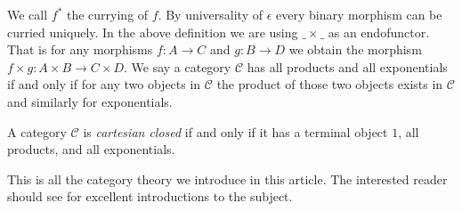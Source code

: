 We call ${f}^*$ the currying of $f$.  By universality of $\epsilon$
every binary morphism can be curried uniquely.  In the above
definition we are using $\_ \times \_$ as an endofunctor.  That is for
any morphisms $f : A \to C$ and $g : B \to D$ we obtain the morphism
$f \times g : A \times B \to C \times D$.  We say a category
$\mathcal{C}$ has all products and all exponentials if and only if for
any two objects in $\mathcal{C}$ the product of those two objects
exists in $\mathcal{C}$ and similarly for exponentials.
\begin{definition}
  \label{def:cartesian}
  A category $\mathcal{C}$ is \emph{cartesian closed} if and only if 
  it has a terminal object $1$, all products, and all exponentials.
\end{definition}
\noindent
This is all the category theory we introduce in this article.  The interested
reader should see \cite{Crole:1994,Gunter:1992,Lawvere:2009,Pierce:1991} for excellent introductions to the subject.

